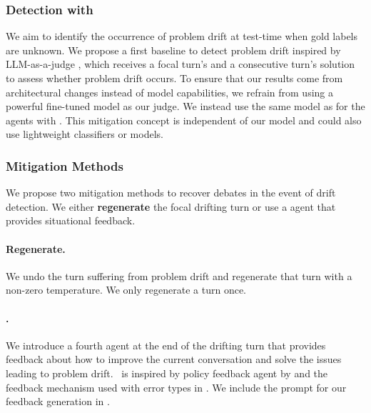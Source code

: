 \subsubsection{Detection with \judge}
We aim to identify the occurrence of problem drift at test-time when gold labels are unknown.
We propose a first baseline to detect problem drift inspired by LLM-as-a-judge \citep{ZhengCSZ23}, which receives a focal turn's and a consecutive turn's solution to assess whether problem drift occurs.
To ensure that our results come from architectural changes instead of model capabilities, we refrain from using a powerful fine-tuned model as our judge.
We instead use the same model as for the agents with \judge.
This mitigation concept is independent of our model and could also use lightweight classifiers or models.

\subsubsection{Mitigation Methods}
We propose two mitigation methods to recover debates in the event of drift detection. 
We either \textbf{regenerate} the focal drifting turn or use a \textbf{\policy} agent that provides situational feedback.

\paragraph{\textbf{Regenerate.}} We undo the turn suffering from problem drift and regenerate that turn with a non-zero temperature. 
We only regenerate a turn once.

\paragraph{\textbf{\policy.}} We introduce a fourth agent at the end of the drifting turn that provides feedback about how to improve the current conversation and solve the issues leading to problem drift.
\policy\ is inspired by policy feedback agent by \citet{FuPKL23b} and the feedback mechanism used with error types in \citet{kirstein-etal-2025-whats}.
We include the prompt for our feedback generation in .


